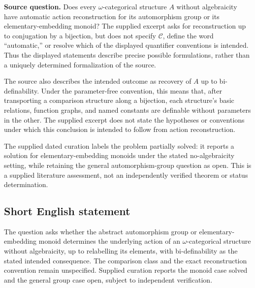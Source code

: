 \documentclass[11pt]{article}
\begin{document}
\textbf{Source question.} Does every \(\omega\)-categorical structure \(A\) without algebraicity have automatic action reconstruction for its automorphism group or its elementary-embedding monoid? The supplied excerpt asks for reconstruction up to conjugation by a bijection, but does not specify \(\mathcal C\), define the word ``automatic,'' or resolve which of the displayed quantifier conventions is intended. Thus the displayed statements describe precise possible formulations, rather than a uniquely determined formalization of the source.

The source also describes the intended outcome as recovery of \(A\) up to bi-definability. Under the parameter-free convention, this means that, after transporting a comparison structure along a bijection, each structure's basic relations, function graphs, and named constants are definable without parameters in the other. The supplied excerpt does not state the hypotheses or conventions under which this conclusion is intended to follow from action reconstruction.

The supplied dated curation labels the problem partially solved: it reports a solution for elementary-embedding monoids under the stated no-algebraicity setting, while retaining the general automorphism-group question as open. This is a supplied literature assessment, not an independently verified theorem or status determination.
\subsection{Short English statement}
The question asks whether the abstract automorphism group or elementary-embedding monoid determines the underlying action of an \(\omega\)-categorical structure without algebraicity, up to relabelling its elements, with bi-definability as the stated intended consequence. The comparison class and the exact reconstruction convention remain unspecified. Supplied curation reports the monoid case solved and the general group case open, subject to independent verification.
\end{document}
